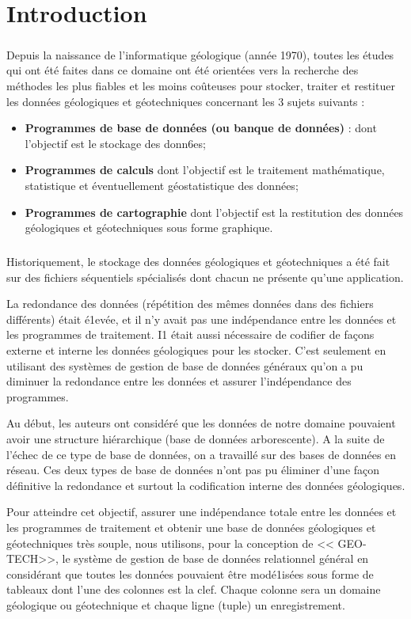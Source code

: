 \chapter*{Introduction}
\paragraph{}
Depuis la naissance de l'informatique géologique (année 1970), toutes les études qui ont été faites dans ce
domaine ont été orientées vers la recherche des
méthodes les plus fiables et les moins coûteuses pour
stocker, traiter et restituer les données géologiques et
géotechniques concernant les 3 sujets suivants :\par 
\begin{itemize}
    \item \textbf{Programmes de base de données (ou banque de
données) }: dont l'objectif est le stockage des donn6es;
    \item \textbf{Programmes de calculs} dont l'objectif est le 
traitement mathématique, statistique et éventuellement géostatistique des données;
    \item \textbf{Programmes de cartographie}
dont l'objectif est la restitution des données géologiques et géotechniques
sous forme graphique.
\end{itemize}

\paragraph{}
Historiquement, le stockage des données géologiques
et géotechniques a été fait sur des fichiers séquentiels
spécialisés dont chacun ne présente qu'une application.
\par
La redondance des données (répétition des mêmes
données dans des fichiers différents) était é1evée, et il
n'y avait pas une indépendance entre les données et les
programmes de traitement. I1 était aussi nécessaire de
codifier de façons externe et interne les données géologiques 
pour les stocker. C'est seulement en utilisant
des systèmes de gestion de base de données généraux
qu'on a pu diminuer la redondance entre les données
et assurer l'indépendance des programmes.
\par
 Au début,
les auteurs ont considéré que les données de notre
domaine pouvaient avoir une structure hiérarchique
(base de données arborescente). A la suite de l'échec
de ce type de base de données, on a travaillé sur des
bases de données en réseau. Ces deux types de base de
données n'ont pas pu éliminer d'une façon définitive
la redondance et surtout la codification interne des
données géologiques.
\cite{tunis}
\par
Pour atteindre cet objectif, assurer une indépendance
totale entre les données et les programmes de traitement 
et obtenir une base de données géologiques et
géotechniques très souple, nous utilisons, pour la
conception de << GEO-TECH>>, le système
de gestion de base de données relationnel général en
considérant que toutes les données pouvaient être
modé1isées sous forme de tableaux  dont
l'une des colonnes est la clef. Chaque colonne sera un
domaine géologique ou géotechnique et chaque ligne (tuple)
un enregistrement.